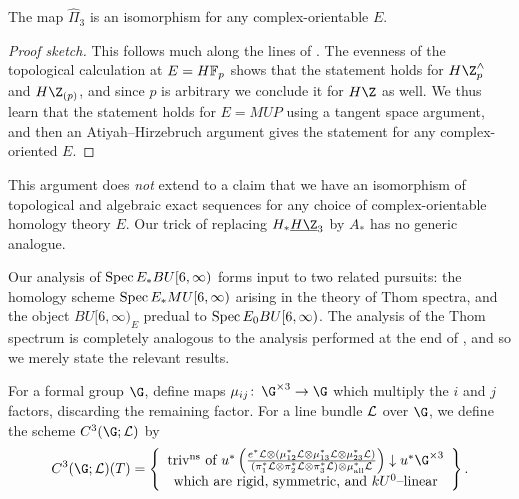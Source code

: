 \begin{corollary}\label{Pi3ForCplxOrientableE}
The map $\hat \Pi_3$ is an isomorphism for any complex-orientable $E$.
\end{corollary}
\begin{proof}[Proof sketch]
This follows much along the lines of .  The evenness of the topological calculation at $E = \HFp$ shows that the statement holds for $H\Z^\wedge_p$ and $H\Z_{(p)}$, and since $p$ is arbitrary we conclude it for $H\Z$ as well.  We thus learn that the statement holds for $E = MUP$ using a tangent space argument, and then an Atiyah--Hirzebruch argument gives the statement for any complex-oriented $E$.
\end{proof}

\begin{remark}
This argument does \emph{not} extend to a claim that we have an isomorphism of topological and algebraic exact sequences for any choice of complex-orientable homology theory $E$.  Our trick of replacing $H_* \OS{H\Z}{3}$ by $A_*$ has no generic analogue.
\end{remark}

Our analysis of $\operatorname{Spec} E_* BU[6, \infty)$ forms input to two related pursuits: the homology scheme $\operatorname{Spec} E_* MU[6, \infty)$ arising in the theory of Thom spectra, and the object $BU[6, \infty)_E$ predual to $\operatorname{Spec} E_0 BU[6, \infty)$.  The analysis of the Thom spectrum is completely analogous to the analysis performed at the end of , and so we merely state the relevant results.

\begin{definition}
For a formal group $\G$, define maps $\mu_{ij}\co \G^{\times 3} \to \G$ which multiply the $i${\th} and $j${\th} factors, discarding the remaining factor.  For a line bundle $\mathcal{L}$ over $\G$, we define the scheme $C^3(\G; \sheaf L)$ by \[C^3(\G; \sheaf L)(T) = \left\{\begin{array}{c}\text{triv\textsuperscript{ns} of $u^*\left(\frac{e^* \sheaf L \otimes (\mu_{12}^* \sheaf L \otimes \mu_{13}^* \sheaf L \otimes \mu_{23}^* \sheaf L)}{(\pi_1^* \sheaf L \otimes \pi_2^* \sheaf L \otimes \pi_3^* \sheaf L) \otimes \mu_{\mathrm{all}}^* \sheaf L}\right) \downarrow u^* \G^{\times 3}$} \\ \text{which are rigid, symmetric, and $kU^0$--linear} \end{array}\right\}.\]
\end{definition}

